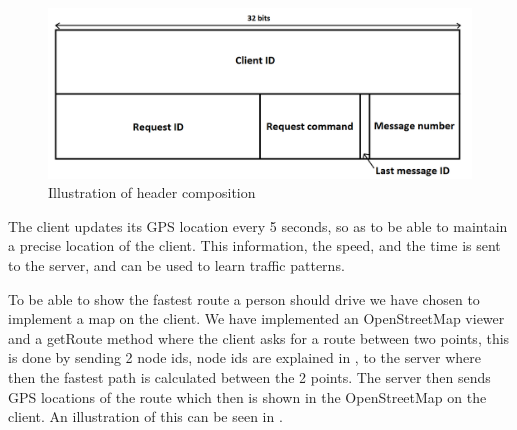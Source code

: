 \begin{figure}[h!]
  \centering
    \includegraphics[width=1\textwidth]{figures/bytesclientserver.png}
    \caption{Illustration of header composition}
    \label{fig:bytesclientserver}
\end{figure}

The client updates its GPS location every 5 seconds, so as to be able to maintain a precise location of the client. This information, the speed, and the time is sent to the server, and can be used to learn traffic patterns.

To be able to show the fastest route a person should drive we have chosen to implement a map on the client. We have implemented an OpenStreetMap viewer and a getRoute method where the client asks for a route between two points, this is done by sending 2 node ids, node ids are explained in , to the server where then the fastest path is calculated between the 2 points. The server then sends GPS locations of the route which then is shown in the OpenStreetMap on the client. An illustration of this can be seen in .

